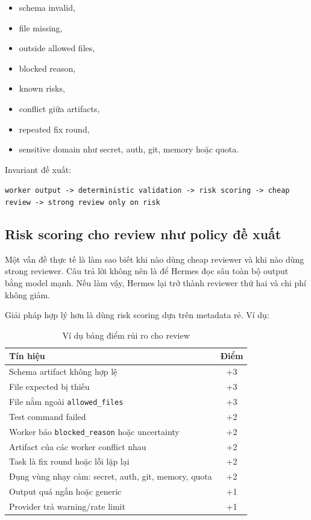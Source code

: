 \documentclass[12pt,a4paper]{article}
\begin{document}
\begin{itemize}
    \item schema invalid,
    \item file missing,
    \item outside allowed files,
    \item blocked reason,
    \item known risks,
    \item conflict giữa artifacts,
    \item repeated fix round,
    \item sensitive domain như secret, auth, git, memory hoặc quota.
\end{itemize}

Invariant đề xuất:

\begin{center}
\texttt{worker output -> deterministic validation -> risk scoring -> cheap review -> strong review only on risk}
\end{center}

\subsection{Risk scoring cho review như policy đề xuất}

Một vấn đề thực tế là làm sao biết khi nào dùng cheap reviewer và khi nào dùng strong reviewer. Câu trả lời không nên là để Hermes đọc sâu toàn bộ output bằng model mạnh. Nếu làm vậy, Hermes lại trở thành reviewer thứ hai và chi phí không giảm.

Giải pháp hợp lý hơn là dùng risk scoring dựa trên metadata rẻ. Ví dụ:

\begin{table}[H]
\centering
\caption{Ví dụ bảng điểm rủi ro cho review}
\begin{tabular}{p{}c}
\toprule
\textbf{Tín hiệu} & \textbf{Điểm} \\
\midrule
Schema artifact không hợp lệ & +3 \\
File expected bị thiếu & +3 \\
File nằm ngoài \texttt{allowed\_files} & +3 \\
Test command failed & +2 \\
Worker báo \texttt{blocked\_reason} hoặc uncertainty & +2 \\
Artifact của các worker conflict nhau & +2 \\
Task là fix round hoặc lỗi lặp lại & +2 \\
Đụng vùng nhạy cảm: secret, auth, git, memory, quota & +2 \\
Output quá ngắn hoặc generic & +1 \\
Provider trả warning/rate limit & +1 \\
\bottomrule
\end{tabular}
\end{table}
\end{document}
